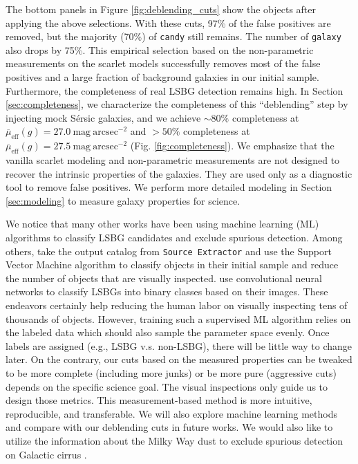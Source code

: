 \documentclass[twocolumn,astrosymb,twocolappendix]{aastex631}
\newcommand{\sbunit}{\mathrm{mag\ arcsec}^{-2}}
\newcommand{\sbeff}{\overline{\mu}_{\mathrm{eff}}(g)}
\newcommand{\code}[1]{\texttt{#1}}
\newcommand{\sersic}{S\'ersic}
\begin{document}
\begin{CJK*}{UTF8}{gbsn}
The bottom panels in Figure \ref{fig:deblending_cuts} show the objects after applying the above selections. With these cuts, 97\% of the false positives are removed, but the majority (70\%) of \code{candy} still remains. The number of \code{galaxy} also drops by 75\%. This empirical selection based on the non-parametric measurements on the scarlet models successfully removes most of the false positives and a large fraction of background galaxies in our initial sample. Furthermore, the completeness of real LSBG detection remains high. In Section \ref{sec:completeness}, we characterize the completeness of this ``deblending'' step by injecting mock \sersic{} galaxies, and we achieve $\sim80\%$ completeness at $\sbeff = 27.0\ \sbunit$ and $>50\%$ completeness at $\sbeff = 27.5\ \sbunit$ (Fig. \ref{fig:completeness}). We emphasize that the vanilla scarlet modeling and non-parametric measurements are not designed to recover the intrinsic properties of the galaxies. They are used only as a diagnostic tool to remove false positives. We perform more detailed modeling in Section \ref{sec:modeling} to measure galaxy properties for science. 


We notice that many other works have been using machine learning (ML) algorithms to classify LSBG candidates and exclude spurious detection. Among others, \citet{Tanoglidis2021} take the output catalog from \code{Source Extractor} and use the Support Vector Machine algorithm to classify objects in their initial sample and reduce the number of objects that are visually inspected. \citet{Zaritsky2019,Zaritsky2021,Zaritsky2022} use convolutional neural networks to classify LSBGs into binary classes based on their images. These endeavors certainly help reducing the human labor on visually inspecting tens of thousands of objects. However, training such a supervised ML algorithm relies on the labeled data which should also sample the parameter space evenly. Once labels are assigned (e.g., LSBG v.s. non-LSBG), there will be little way to change later. On the contrary, our cuts based on the measured properties can be tweaked to be more complete (including more junks) or be more pure (aggressive cuts) depends on the specific science goal. The visual inspections only guide us to design those metrics. This measurement-based method is more intuitive, reproducible, and transferable. We will also explore machine learning methods and compare with our deblending cuts in future works. We would also like to utilize the information about the Milky Way dust to exclude spurious detection on Galactic cirrus \citep{Zaritsky2021,Zaritsky2022}.


\end{CJK*}
\end{document}
